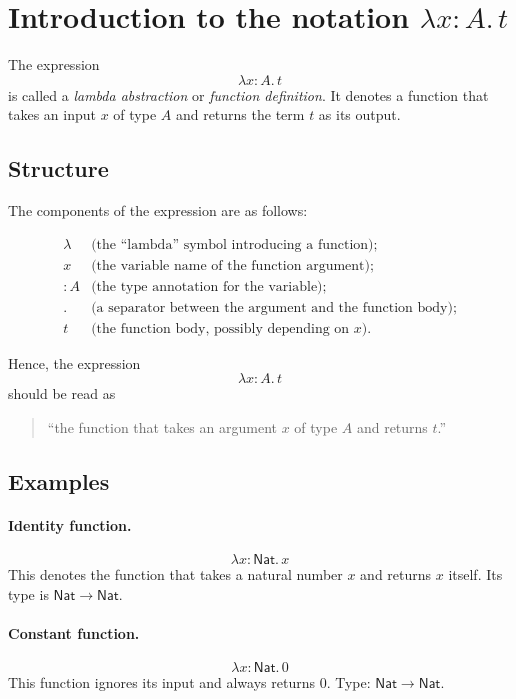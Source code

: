 \documentclass{article}
\newcommand{\Nat}{\mathsf{Nat}}
\begin{document}
\section{Introduction to the notation \texorpdfstring{$\lambda x\!:\!A.\,t$}{λx:A.t}}

The expression
\[
\lambda x\!:\!A.\,t
\]
is called a \emph{lambda abstraction} or \emph{function definition}.  
It denotes a function that takes an input \(x\) of type \(A\) and returns the term \(t\) as its output.

\subsection*{Structure}

The components of the expression are as follows:

\[
\begin{array}{ll}
\lambda & \text{(the ``lambda'' symbol introducing a function);} \\
x & \text{(the variable name of the function argument);} \\
:A & \text{(the type annotation for the variable);} \\
. & \text{(a separator between the argument and the function body);} \\
t & \text{(the function body, possibly depending on \(x\)).}
\end{array}
\]

Hence, the expression
\[
\lambda x\!:\!A.\,t
\]
should be read as
\begin{quote}
``the function that takes an argument \(x\) of type \(A\) and returns \(t\).''  
\end{quote}

\subsection*{Examples}

\paragraph{Identity function.}
\[
\lambda x\!:\!\Nat.\,x
\]
This denotes the function that takes a natural number \(x\) and returns \(x\) itself.  
Its type is \(\Nat \to \Nat\).

\paragraph{Constant function.}
\[
\lambda x\!:\!\Nat.\,0
\]
This function ignores its input and always returns \(0\).  
Type: \(\Nat \to \Nat\).
\end{document}

